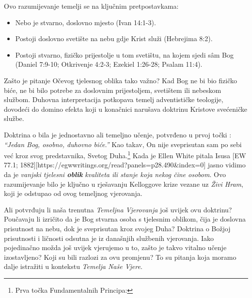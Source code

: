 Ovo razumijevanje temelji se na ključnim pretpostavkama:
\begin{itemize}
    \item Nebo je stvarno, doslovno mjesto (Ivan 14:1-3).
    \item Postoji doslovno svetište na nebu gdje Krist služi (Hebrejima 8:2).
    \item Postoji stvarno, fizičko prijestolje u tom svetištu, na kojem sjedi sâm Bog (Daniel 7:9-10; Otkrivenje 4:2-3; Ezekiel 1:26-28; Psalam 11:4).
\end{itemize}

Zašto je pitanje Očevog tjelesnog oblika tako važno? Kad Bog ne bi bio fizičko biće, ne bi bilo potrebe za doslovnim prijestoljem, svetištem ili nebeskom službom. Duhovna interpretacija potkopava temelj adventističke teologije, dovodeći do domino efekta koji u konačnici narušava doktrinu Kristove svećeničke službe.

Doktrina o  bila je jednostavno ali temeljno učenje, potvrđeno u prvoj točki : \textit{“Jedan Bog, osobno, duhovno biće.”} Kao takav, On nije sveprisutan sam po sebi već kroz svog predstavnika, Svetog Duha.\footnote{Prva točka Fundamentalnih Principa: } Kada je Ellen White pitala Isusa [EW 77.1; 1882][https://egwwritings.org/read?panels=p28.490&index=0] jasno vidimo da je \textit{vanjski tjelesni \textbf{oblik}} \textit{kvaliteta ili stanje koja nekog čine osobom}. Ovo razumijevanje bilo je ključno u rješavanju Kelloggove krize vezane uz \textit{Živi Hram}, koji je odstupao od ovog temeljnog vjerovanja.

Ali potvrđuju li naša trenutna \textit{Temeljna Vjerovanja} još uvijek ovu doktrinu? Poučavaju li izričito da je Bog stvarna osoba s tjelesnim oblikom, čija je doslovna prisutnost na nebu, dok je sveprisutan kroz svojeg Duha? Doktrina o Božjoj prisutnosti i ličnosti odsutna je iz današnjih službenih vjerovanja. Iako pojedinačno možda još uvijek vjerujemo u to, zašto je takvo vitalno učenje izostavljeno? Koji su bili razlozi za ovu promjenu? To su pitanja koja moramo dalje istražiti u kontekstu \textit{Temelja Naše Vjere}.
